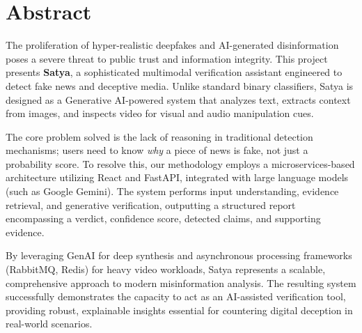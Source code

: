 \chapter*{Abstract}

The proliferation of hyper-realistic deepfakes and AI-generated disinformation poses a severe threat to public trust and information integrity. This project presents \textbf{Satya}, a sophisticated multimodal verification assistant engineered to detect fake news and deceptive media. Unlike standard binary classifiers, Satya is designed as a Generative AI-powered system that analyzes text, extracts context from images, and inspects video for visual and audio manipulation cues. 

The core problem solved is the lack of reasoning in traditional detection mechanisms; users need to know \textit{why} a piece of news is fake, not just a probability score. To resolve this, our methodology employs a microservices-based architecture utilizing React and FastAPI, integrated with large language models (such as Google Gemini). The system performs input understanding, evidence retrieval, and generative verification, outputting a structured report encompassing a verdict, confidence score, detected claims, and supporting evidence. 

By leveraging GenAI for deep synthesis and asynchronous processing frameworks (RabbitMQ, Redis) for heavy video workloads, Satya represents a scalable, comprehensive approach to modern misinformation analysis. The resulting system successfully demonstrates the capacity to act as an AI-assisted verification tool, providing robust, explainable insights essential for countering digital deception in real-world scenarios.
